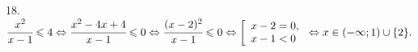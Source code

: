 18. $\cfrac{x^2}{x-1}\leqslant 4 \Leftrightarrow \cfrac{x^2-4x+4}{x-1}\leqslant 0 \Leftrightarrow \cfrac{(x-2)^2}{x-1}\leqslant 0
\Leftrightarrow
\left[\begin{array}{l}
x-2=0,\\
x-1<0
\end{array}\right.\Leftrightarrow x \in (-\infty;1)\cup\{2\}.$\\
